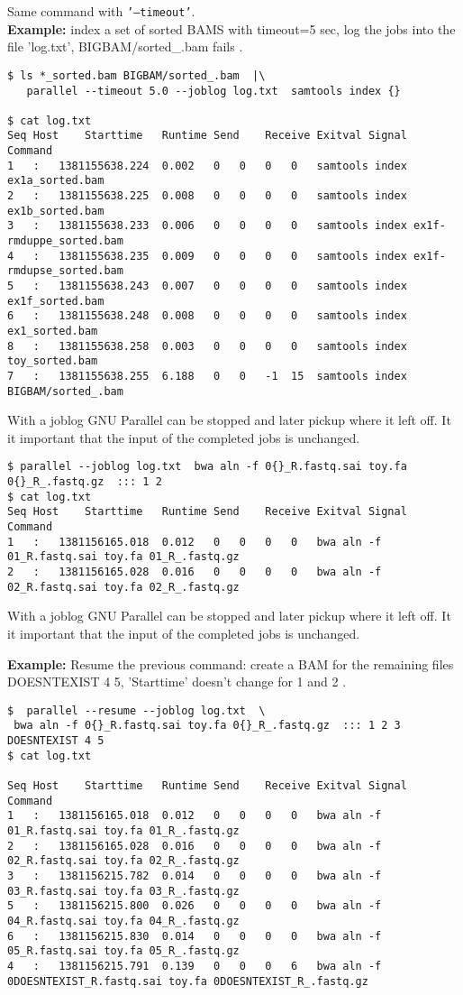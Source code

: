 \documentclass{article}
\newcommand{\example}[1]{
\textbf{Example: } {\color[rgb]{0,0,1} #1 } .
}
\newcommand{\cmdoption}[1]{\texttt{'#1'}}
\begin{document}
Same command with \cmdoption{--timeout}.\\
\example{index a set of sorted BAMS with timeout=5 sec, log the jobs into the file 'log.txt', BIGBAM/sorted\_.bam fails}
\begin{lstlisting}
$ ls *_sorted.bam BIGBAM/sorted_.bam  |\
   parallel --timeout 5.0 --joblog log.txt  samtools index {}

$ cat log.txt
Seq	Host	Starttime	Runtime	Send	Receive	Exitval	Signal	Command
1	:	1381155638.224	0.002	0	0	0	0	samtools index ex1a_sorted.bam
2	:	1381155638.225	0.008	0	0	0	0	samtools index ex1b_sorted.bam
3	:	1381155638.233	0.006	0	0	0	0	samtools index ex1f-rmduppe_sorted.bam
4	:	1381155638.235	0.009	0	0	0	0	samtools index ex1f-rmdupse_sorted.bam
5	:	1381155638.243	0.007	0	0	0	0	samtools index ex1f_sorted.bam
6	:	1381155638.248	0.008	0	0	0	0	samtools index ex1_sorted.bam
8	:	1381155638.258	0.003	0	0	0	0	samtools index toy_sorted.bam
7	:	1381155638.255	6.188	0	0	-1	15	samtools index BIGBAM/sorted_.bam
\end{lstlisting}
With a joblog GNU Parallel can be stopped and later pickup where it left off. It it important that the input of the completed jobs is unchanged.
\begin{lstlisting}
$ parallel --joblog log.txt  bwa aln -f 0{}_R.fastq.sai toy.fa 0{}_R_.fastq.gz  ::: 1 2
$ cat log.txt
Seq	Host	Starttime	Runtime	Send	Receive	Exitval	Signal	Command
1	:	1381156165.018	0.012	0	0	0	0	bwa aln -f 01_R.fastq.sai toy.fa 01_R_.fastq.gz
2	:	1381156165.028	0.016	0	0	0	0	bwa aln -f 02_R.fastq.sai toy.fa 02_R_.fastq.gz
\end{lstlisting}
With a joblog GNU Parallel can be stopped and later pickup where it left off. It it important that the input of the completed jobs is unchanged.
\example{Resume the previous command: create a BAM  for the remaining files  DOESNTEXIST 4 5, 'Starttime' doesn't change for 1 and 2 }
\begin{lstlisting}
$  parallel --resume --joblog log.txt  \
 bwa aln -f 0{}_R.fastq.sai toy.fa 0{}_R_.fastq.gz  ::: 1 2 3 DOESNTEXIST 4 5
$ cat log.txt

Seq	Host	Starttime	Runtime	Send	Receive	Exitval	Signal	Command
1	:	1381156165.018	0.012	0	0	0	0	bwa aln -f 01_R.fastq.sai toy.fa 01_R_.fastq.gz
2	:	1381156165.028	0.016	0	0	0	0	bwa aln -f 02_R.fastq.sai toy.fa 02_R_.fastq.gz
3	:	1381156215.782	0.014	0	0	0	0	bwa aln -f 03_R.fastq.sai toy.fa 03_R_.fastq.gz
5	:	1381156215.800	0.026	0	0	0	0	bwa aln -f 04_R.fastq.sai toy.fa 04_R_.fastq.gz
6	:	1381156215.830	0.014	0	0	0	0	bwa aln -f 05_R.fastq.sai toy.fa 05_R_.fastq.gz
4	:	1381156215.791	0.139	0	0	0	6	bwa aln -f 0DOESNTEXIST_R.fastq.sai toy.fa 0DOESNTEXIST_R_.fastq.gz
\end{lstlisting}
\end{document}

